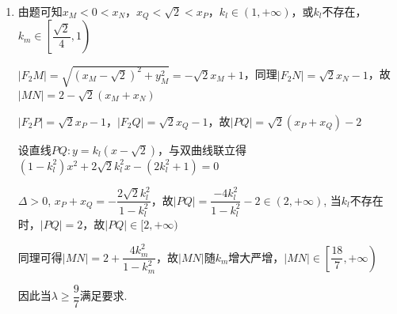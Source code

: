 \begin{enumerate}
\begin{jieda}
\begin{enumerate}
            \item 由题可知$x_M < 0 < x_N$，$x_Q < \sqrt{2} < x_P$，$k_l \in (1, +\infty)$，或$k_l$不存在，$k_m \in \left[\dfrac{\sqrt{2}}{4}, 1\right)$
            
            $|F_2M| = \sqrt{(x_M-\sqrt{2})^2+y_M^2} = -\sqrt{2}x_M+1$，同理$|F_2N| = \sqrt{2}x_N - 1$，故$|MN| = 2-\sqrt{2}(x_M+x_N)$

            $|F_2P| = \sqrt{2}x_P - 1$，$|F_2Q| = \sqrt{2}x_Q - 1$，故$|PQ| = \sqrt{2}(x_P + x_Q) - 2$

            设直线$PQ: y = k_l(x-\sqrt{2})$，与双曲线联立得$(1-k_l^2)x^2+2\sqrt{2}k_l^2x-(2k_l^2+1)=0$

            $\Delta>0$, $x_P+x_Q=-\dfrac{2\sqrt{2}k_l^2}{1-k_l^2}$，故$|PQ|= \dfrac{-4k_l^2}{1-k_l^2}-2 \in (2,+\infty)$, 当$k_l$不存在时，$|PQ|=2$，故$|PQ|\in [2,+\infty)$

            同理可得$|MN|=2+\dfrac{4k_m^2}{1-k_m^2}$，故$|MN|$随$k_m$增大严增，$|MN|\in \left[\dfrac{18}{7},+\infty\right)$

            因此当$\lambda \geq \dfrac{9}{7}$满足要求.
        \end{enumerate}
    \end{jieda}
    

\end{enumerate}
